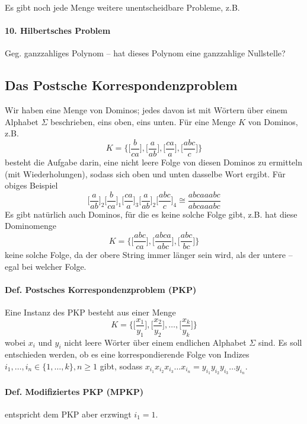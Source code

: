 \par\medskip Es gibt noch jede Menge weitere unentscheidbare Probleme, z.B.

\paragraph*{10. Hilbertsches Problem} Geg. ganzzahliges Polynom -- hat dieses Polynom eine ganzzahlige Nullstelle?


\subsection{Das Postsche Korrespondenzproblem}


Wir haben eine Menge von Dominos; jedes davon ist mit Wörtern über einem Alphabet $\Sigma$ beschrieben, eins oben, eins unten. Für eine Menge $K$ von Dominos, z.B. $$ K=\Bigg\{ \Bigg[\frac{b}{ca}\Bigg], \Bigg[\frac{a}{ab}\Bigg], \Bigg[\frac{ca}{a}\Bigg], \Bigg[\frac{abc}{c}\Bigg] \Bigg\} $$ besteht die Aufgabe darin, eine nicht leere Folge von diesen Dominos zu ermitteln (mit Wiederholungen), sodass sich oben und unten dasselbe Wort ergibt. Für obiges Beispiel $$ \Bigg[\frac{a}{ab}\Bigg]_2 \Bigg[\frac{b}{ca}\Bigg]_1 \Bigg[\frac{ca}{a}\Bigg]_3 \Bigg[\frac{a}{ab}\Bigg]_2 \Bigg[\frac{abc}{c}\Bigg]_4 \cong \frac{abcaaabc}{abcaaabc} $$
Es gibt natürlich auch Dominos, für die es keine solche Folge gibt, z.B. hat diese Dominomenge $$ K=\Bigg\{ \Bigg[\frac{abc}{ca}\Bigg], \Bigg[\frac{abca}{abc}\Bigg], \Bigg[\frac{abc}{bc}\Bigg] \Bigg\} $$ keine solche Folge, da der obere String immer länger sein wird, als der untere -- egal bei welcher Folge.

\paragraph*{Def. Postsches Korrespondenzproblem (PKP)} Eine Instanz des PKP besteht aus einer Menge $$ K=\Bigg\{ \Bigg[\frac{x_1}{y_1}\Bigg], \Bigg[\frac{x_2}{y_2}\Bigg], \dots, \Bigg[\frac{x_k}{y_k}\Bigg] \Bigg\} $$ wobei $x_i$ und $y_i$ nicht leere Wörter über einem endlichen Alphabet $\Sigma$ sind. Es soll entschieden werden, ob es eine korrespondierende Folge von Indizes $i_1,\dots,i_n \in \{ 1,\dots,k \}, n \geq 1$ gibt, sodass $x_{i_1}x_{i_2}x_{i_3}\dots x_{i_n} = y_{i_1}y_{i_2}y_{i_3}\dots y_{i_n}$.

\paragraph*{Def. Modifiziertes PKP (MPKP)} entspricht dem PKP aber erzwingt $i_1 = 1$.

